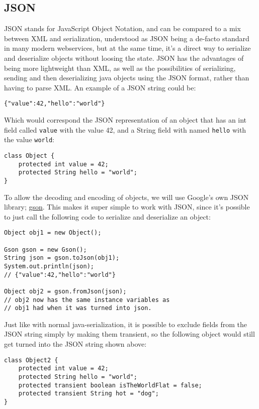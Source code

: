 \documentclass{acm_proc_article-sp}
\begin{document}
\subsection{JSON}
JSON stands for JavaScript Object Notation, and can be compared to a mix between XML and serialization, understood as JSON being a de-facto standard in many modern webservices, but at the same time, it's a direct way to serialize and deserialize objects without loosing the state. JSON has the advantages of being more lightweight than XML, as well as the possibilities of serializing, sending and then deserializing java objects using the JSON format, rather than having to parse XML. An example of a JSON string could be:

\begin{verbatim}
{"value":42,"hello":"world"}
\end{verbatim}

Which would correspond the JSON representation of an object that has an int field called \texttt{value} with the value 42, and a String field with named \texttt{hello} with the value \texttt{world}:

\begin{verbatim}
class Object {
	protected int value = 42;
	protected String hello = "world";
}
\end{verbatim}

To allow the decoding and encoding of objects, we will use Google's own JSON library; \href{http://code.google.com/p/google-gson/}{gson}. This makes it super simple to work with JSON, since it's possible to just call the following code to serialize and deserialize an object:

\begin{verbatim}
Object obj1 = new Object();

Gson gson = new Gson();
String json = gson.toJson(obj1);
System.out.println(json); 
// {"value":42,"hello":"world"}

Object obj2 = gson.fromJson(json);
// obj2 now has the same instance variables as 
// obj1 had when it was turned into json.
\end{verbatim}

Just like with normal java-serialization, it is possible to exclude fields from the JSON string simply by making them transient, so the following object would still get turned into the JSON string shown above:

\begin{verbatim}
class Object2 {
	protected int value = 42;
	protected String hello = "world";
	protected transient boolean isTheWorldFlat = false;
	protected transient String hot = "dog";
}
\end{verbatim}
\end{document}
